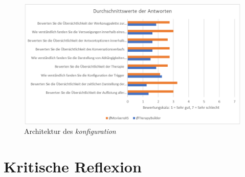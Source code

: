 \begin{figure}[!h]
\centering
\includegraphics[width=1\textwidth]{pictures/diagramme/antwortendurchsch2}
\caption{Architektur des \emph{konfiguration}}
\label{therapyBuilder}
\end{figure}

\section{Kritische Reflexion}